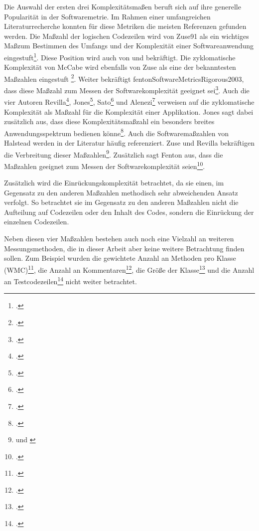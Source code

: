 Die Auswahl der ersten drei Komplexitätsma\ss en beruft sich auf ihre
generelle Popularität in der Softwaremetrie. Im Rahmen einer
umfangreichen Literaturrecherche konnten für diese Metriken die meisten
Referenzen gefunden werden. Die Ma\ss zahl der logischen Codezeilen wird
von Zuse91 als ein wichtiges Ma\ss  zum Bestimmen des Umfangs und der
Komplexität einer Softwareanwendung eingestuft\footcite[Vgl. ][S. 145]{zuseSoftwareComplexityMeasures1991}.
Diese Position wird auch von \cite{satoExperiencesTrackingAgile2006} und
\cite{aleneziEmpiricalAnalysisComplexity2015} bekräftigt. Die zyklomatische
Komplexität von McCabe wird ebenfalls von Zuse als eine der bekanntesten
Ma\ss zahlen eingestuft \footcite[Vgl. ][S. 145]{zuseSoftwareComplexityMeasures1991}. Weiter bekräftigt
fentonSoftwareMetricsRigorous2003, dass diese Ma\ss zahl zum Messen der
Softwarekomplexität geeignet sei\footcite[Vgl. ][S. 31]{fentonSoftwareMetricsRigorous2003}. Auch die vier Autoren Revilla\footcite[Vgl. ][S. 203]{revillaCorrelationsInternalSoftware2007},
Jones\footcite[Vgl. ][S. 335, 627 und 449]{jonesAppliedSoftwareMeasurement2008}, Sato\footcite[Vgl. ][]{satoExperiencesTrackingAgile2006}
und Alenezi\footcite[Vgl. ][]{aleneziEmpiricalAnalysisComplexity2015} verweisen
auf die zyklomatische Komplexität als Ma\ss zahl für die Komplexität einer
Applikation. Jones sagt dabei zusätzlich aus, dass diese
Komplexitätsma\ss zahl ein besonders breites Anwendungsspektrum bedienen
könne\footcite[Vgl. ][S. 335, 627 und 449]{jonesAppliedSoftwareMeasurement2008}. Auch die Softwarema\ss zahlen
von Halstead werden in der Literatur häufig referenziert. Zuse und
Revilla bekräftigen die Verbreitung dieser Ma\ss zahlen\footnote{\cite[Vgl. ][S. 145]{zuseSoftwareComplexityMeasures1991} und \cite[S. 203]{revillaCorrelationsInternalSoftware2007}}. Zusätzlich sagt Fenton aus, dass die Ma\ss zahlen
geeignet zum Messen der Softwarekomplexität seien\footcite[Vgl. ][S. 31]{fentonSoftwareMetricsRigorous2003}.

Zusätzlich wird die Einrückungskomplexität betrachtet, da sie einen, im
Gegensatz zu den anderen Ma\ss zahlen methodisch sehr abweichenden Ansatz
verfolgt. So betrachtet sie im Gegensatz zu den
anderen Ma\ss zahlen nicht die Aufteilung auf Codezeilen oder den Inhalt
des Codes, sondern die Einrückung der einzelnen Codezeilen.

Neben diesen vier Ma\ss zahlen bestehen auch noch eine Vielzahl an weiteren
Messungsmethoden, die in dieser Arbeit aber keine weitere Betrachtung
finden sollen. Zum Beispiel wurden die gewichtete Anzahl an Methoden pro
Klasse (WMC)\footcite[Vgl. ][]{satoExperiencesTrackingAgile2006}, die Anzahl an
Kommentaren\footcite[Vgl. ][S. 207]{revillaCorrelationsInternalSoftware2007}, die Grö\ss e der Klasse\footcite[Vgl. ][]{satoExperiencesTrackingAgile2006}
und die Anzahl an Testcodezeilen\footcite[Vgl. ][]{satoExperiencesTrackingAgile2006}
nicht weiter betrachtet.

